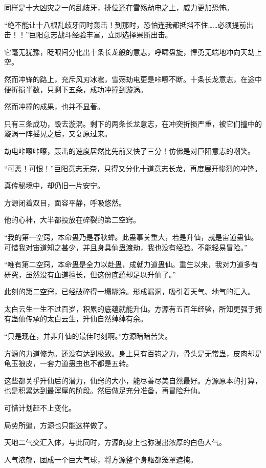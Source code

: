 \begin{this_body}
同样是十大凶灾之一的乱歧牙，排位还在雪殇劫电之上，威力更加恐怖。

“绝不能让十八根乱歧牙同时轰击！到那时，恐怕连我都抵挡不住……必须提前出击！！”巨阳意志战斗经验丰富，立即选择果断出击。

它毫无犹豫，眨眼间分化出十条长龙般的意志，呼啸盘旋，悍勇无端地冲向天劫上空。

然而冲锋的路上，充斥风刃冰雹，雪殇劫电更是咔嚓不断。十条长龙意志，在途中便折损半数，只剩下五条，成功冲撞到漩涡。

然而冲撞的成果，也并不显著。

只有三条成功，毁去漩涡。剩下的两条长龙意志，在冲突折损严重，被它们撞中的漩涡一阵摇晃之后，又复原过来。

劫电咔嚓咔嚓，轰击的速度居然比先前又快了三分！仿佛是对巨阳意志的嘲笑。

“可恶！可恨！”巨阳意志无奈，只得又分化十道意志长龙，再度展开惨烈的冲锋。

真传秘境中，却仍旧一片安宁。

方源闭着双目，面容平静，呼吸悠然。

他的心神，大半都投放在碎裂的第二空窍。

“我的第一空窍，本命蛊乃是春秋蝉。此蛊事关重大，若是升仙，就是宙道蛊仙。可惜我对宙道知之甚少，并且身具仙蛊渡劫，我也没有经验。不能轻易冒险。”

“唯有第二空窍，本命蛊是全力以赴蛊，成就力道蛊仙。重生以来，我对力道多有研究，虽然没有血道擅长，但这份底蕴却足以升仙了。”

此刻的第二空窍，已经破碎得一塌糊涂。形成漏洞，吸引着天气、地气的汇入。

太白云生一生不过百岁，积累的底蕴就能升仙。方源有五百年经验，所知更强于拥有蛊仙传承的太白云生，升仙自然绰绰有余。

“只是现在，并非升仙的最佳时刻啊。”方源暗暗苦笑。

方源的力道修为。还没有达到极致。身上只有百钧之力，骨头是无常蛊，皮肉却是龟玉狼皮，一套力道蛊虫也不都是五转。

这些都关乎升仙后的潜力，仙窍的大小，能尽善尽美自然最好。方源原本的打算，也是积累达到最浑厚的阶段。然后做足充分准备，再冒险升仙。

可惜计划赶不上变化。

局势所逼，方源也只能这样做了。

天地二气交汇入体，与此同时，方源的身上也弥漫出浓厚的白色人气。

人气浓郁，团成一个巨大气球，将方源整个身躯都笼罩遮掩。


\end{this_body}
